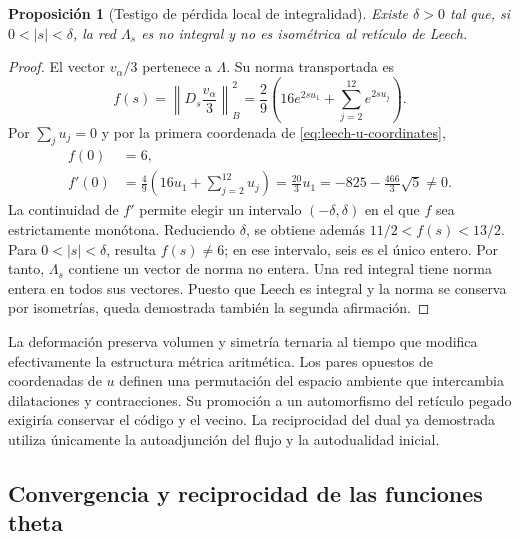 \documentclass[a4paper,10pt]{article}
\newtheorem{proposition}[theorem]{Proposición}
\theoremstyle{definition}\newtheorem{definition}[theorem]{Definición}
\theoremstyle{remark}\newtheorem{remark}[theorem]{Observación}
\numberwithin{equation}{section}
\begin{document}
\begin{proposition}[Testigo de pérdida local de integralidad]
\label{prop:leech-nonintegral}
Existe \(\delta>0\) tal que, si \(0<|s|<\delta\), la red
\(\Lambda_s\) es no integral y no es isométrica al retículo de Leech.
\end{proposition}
\begin{proof}
El vector \(v_\alpha/3\) pertenece a \(\Lambda\). Su norma
transportada es
\begin{equation}
 f(s)=\left\|D_s\frac{v_\alpha}{3}\right\|_B^2
 =\frac29\left(16e^{2su_1}+
                       \sum_{j=2}^{12}e^{2su_j}\right).
 \label{eq:leech-witness}
\end{equation}
Por \(\sum_j u_j=0\) y por la primera coordenada de
\eqref{eq:leech-u-coordinates},
\begin{equation}
\begin{split}
 f(0)&=6,\\
 f'(0)&=\frac49\left(16u_1+\sum_{j=2}^{12}u_j\right)
       =\frac{20}{3}u_1
       =-825-\frac{466}{3}\sqrt5\ne0.
\end{split}
\label{eq:leech-witness-derivative}
\end{equation}
La continuidad de \(f'\) permite elegir un intervalo
\((-\delta,\delta)\) en el que \(f\) sea estrictamente monótona.
Reduciendo \(\delta\), se obtiene además
\(11/2<f(s)<13/2\). Para \(0<|s|<\delta\), resulta \(f(s)\ne6\);
en ese intervalo, seis es el único entero. Por tanto, \(\Lambda_s\)
contiene un vector de norma no entera. Una red integral tiene
norma entera en todos sus vectores. Puesto que Leech es integral
y la norma se conserva por isometrías, queda demostrada también
la segunda afirmación.
\end{proof}

La deformación preserva volumen y simetría ternaria al tiempo que
modifica efectivamente la estructura métrica aritmética. Los pares
opuestos de coordenadas de \(u\) definen una permutación del espacio
ambiente que intercambia dilataciones y contracciones. Su promoción
a un automorfismo del retículo pegado exigiría conservar el código
y el vecino. La reciprocidad del dual ya demostrada utiliza
únicamente la autoadjunción del flujo y la autodualidad inicial.

\subsection{Convergencia y reciprocidad de las funciones theta}
\label{subsec:leech-theta}
\end{document}
